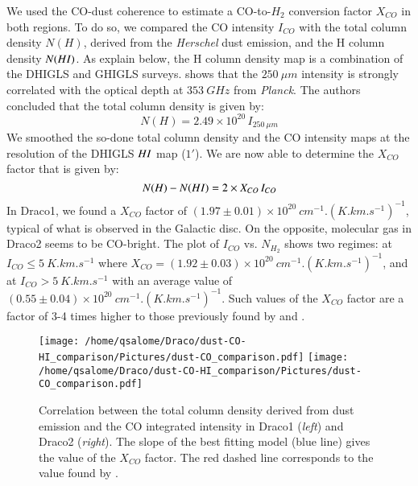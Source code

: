 \documentclass[traditabstract]{aa}
\begin{document}
   We used the CO-dust coherence to estimate a CO-to-$H_2$ conversion factor $X_{CO}$ in both regions. To do so, we compared the CO intensity $I_{CO}$ with the total column density $N(H)$, derived from the \emph{Herschel} dust emission, and the H column density $N(H\rmnum{1})$. As explain below, the H column density map is a combination of the DHIGLS and GHIGLS surveys. \cite{MAMD_2017b} shows that the $250\: \mu m$ intensity is strongly correlated with the optical depth at $353\: GHz$ from \emph{Planck}. The authors concluded that the total column density is given by:
\begin{equation}
  N(H)=2.49\times 10^{20}\, I_{250\: \mu m}
\end{equation}
We smoothed the so-done total column density and the CO intensity maps at the resolution of the DHIGLS $H\rmnum{1}$ map ($1'$). We are now able to determine the $X_{CO}$ factor that is given by:
\begin{equation}
  N(H)-N(H\rmnum{1})=2\times X_{CO}\, I_{CO}
\end{equation}
In Draco1, we found a $X_{CO}$ factor of $(1.97\pm 0.01)\times 10^{20}\: cm^{-1}.(K.km.s^{-1})^{-1}$, typical of what is observed in the Galactic disc\citep{Bolatto_2013}. On the opposite, molecular gas in Draco2 seems to be CO-bright. The plot of $I_{CO}$ vs. $N_{H_2}$ shows two regimes: at $I_{CO}\leq 5\: K.km.s^{-1}$ where $X_{CO}=(1.92\pm 0.03)\times 10^{20}\: cm^{-1}.(K.km.s^{-1})^{-1}$, and at $I_{CO}>5\: K.km.s^{-1}$ with an average value of $(0.55\pm 0.04)\times 10^{20}\: cm^{-1}.(K.km.s^{-1})^{-1}$.
Such values of the $X_{CO}$ factor are a factor of 3-4 times higher to those previously found by \cite{Herbstmeier_1993} and \cite{Moritz_1998}.

\begin{figure*}[h!]
  \centering
  \texttt{[image: /home/qsalome/Draco/dust-CO-HI\_comparison/Pictures/dust-CO\_comparison.pdf]}
  \hspace{3mm}
  \texttt{[image: /home/qsalome/Draco/dust-CO-HI\_comparison/Pictures/dust-CO\_comparison.pdf]}
  \caption{\label{Xco} Correlation between the total column density derived from dust emission and the CO integrated intensity in Draco1 (\emph{left}) and Draco2 (\emph{right}). The slope of the best fitting model (blue line) gives the value of the $X_{CO}$ factor. The red dashed line corresponds to the value found by \cite{Moritz_1998}.}
\end{figure*}
\end{document}
